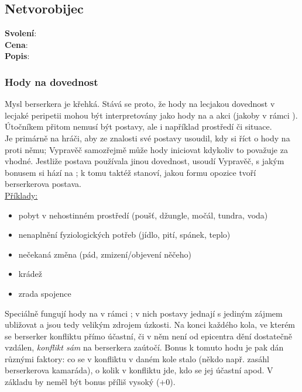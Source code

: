 \documentclass[../main.tex]{subfiles}
\begin{document}
\begin{tcolorbox}
\subsection{Netvorobijec}
\label{sec:pov-netvorobijec}
\textbf{Svolení}:\\
\textbf{Cena}:\\
\textbf{Popis}:\\
\end{tcolorbox}

\subsubsection*{Hody na dovednost }
Mysl berserkera je křehká. Stává se proto, že hody na lecjakou dovednost v lecjaké peripetii mohou být interpretovány jako hody na  a akci  (jakoby v rámci ). Útočníkem přitom nemusí být postavy, ale i například prostředí či situace. \\
Je primárně na hráči, aby ze znalosti své postavy usoudil, kdy si říct o hody na  proti němu; Vypravěč samozřejmě může hody iniciovat kdykoliv to považuje za vhodné. Jestliže postava používala jinou dovednost, usoudí Vypravěč, s jakým bonusem si hází na ; k tomu taktéž stanoví, jakou formu opozice tvoří berserkerova postava.\\

\underline{Příklady:}
\begin{itemize}
\item pobyt v nehostinném prostředí (poušť, džungle, močál, tundra, voda)
\item nenaplnění fyziologických potřeb (jídlo, pití, spánek, teplo)
\item nečekaná změna (pád, zmizení/objevení něčeho)
\item krádež
\item zrada spojence
\end{itemize}

Speciálně fungují hody na  v rámci ; v nich postavy jednají s jediným zájmem ubližovat a jsou tedy velikým zdrojem úzkosti. Na konci každého kola, ve kterém se berserker konfliktu přímo účastní, či v něm není od epicentra dění dostatečně vzdálen, \textit{konflikt sám} na berserkera  zaútočí. Bonus k tomuto hodu je pak dán různými faktory: co se v konfliktu v daném kole stalo (někdo např. zasáhl berserkerova kamaráda), o kolik v konfliktu jde, kdo se jej účastní apod. V základu by neměl být bonus příliš vysoký (+0).\\
\end{document}
